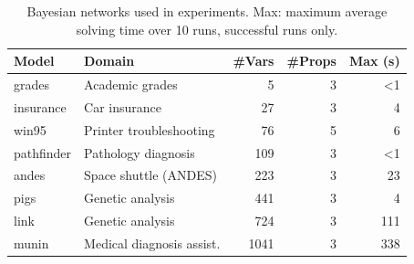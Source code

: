 \begin{table}[t]
\centering
\caption{Bayesian networks used in experiments.
Max: maximum average solving time over 10 runs, successful runs only.}
\label{tab:models}
\small
\begin{tabularx}{\textwidth}{@{}lYrrr@{}}
\toprule
\textbf{Model} & \textbf{Domain} & \textbf{\#Vars} & \textbf{\#Props} & \textbf{Max (s)} \\
\midrule
grades & Academic grades & 5 & 3 & \textless{}1 \\
insurance & Car insurance & 27 & 3 & 4 \\
win95 & Printer troubleshooting & 76 & 5 & 6 \\
pathfinder & Pathology diagnosis & 109 & 3 & \textless{}1 \\
andes & Space shuttle (ANDES) & 223 & 3 & 23 \\
pigs & Genetic analysis & 441 & 3 & 4 \\
link & Genetic analysis & 724 & 3 & 111 \\
munin & Medical diagnosis assist. & 1041 & 3 & 338 \\
\bottomrule
\end{tabularx}
\end{table}
